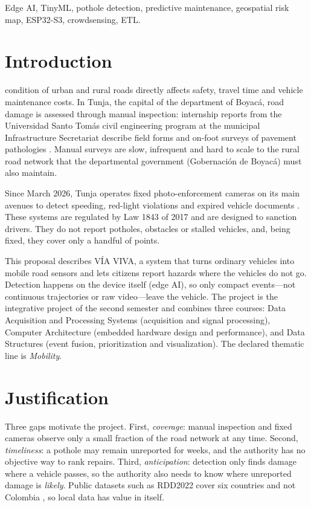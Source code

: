 \documentclass[journal,10pt]{IEEEtran}
\begin{document}
\begin{IEEEkeywords}
Edge AI, TinyML, pothole detection, predictive maintenance, geospatial risk map, ESP32-S3, crowdsensing, ETL.
\end{IEEEkeywords}

\section{Introduction}
 condition of urban and rural roads directly affects safety, travel time and vehicle maintenance costs. In Tunja, the capital of the department of Boyac\'a, road damage is assessed through manual inspection: internship reports from the Universidad Santo Tom\'as civil engineering program at the municipal Infrastructure Secretariat describe field forms and on-foot surveys of pavement pathologies \cite{caballero2022practica}. Manual surveys are slow, infrequent and hard to scale to the rural road network that the departmental government (Gobernaci\'on de Boyac\'a) must also maintain.

Since March 2026, Tunja operates fixed photo-enforcement cameras on its main avenues to detect speeding, red-light violations and expired vehicle documents \cite{infobae2026tunja}. These systems are regulated by Law 1843 of 2017 \cite{ley1843} and are designed to sanction drivers. They do not report potholes, obstacles or stalled vehicles, and, being fixed, they cover only a handful of points.

This proposal describes V\'IA VIVA, a system that turns ordinary vehicles into mobile road sensors and lets citizens report hazards where the vehicles do not go. Detection happens on the device itself (edge AI), so only compact events---not continuous trajectories or raw video---leave the vehicle. The project is the integrative project of the second semester and combines three courses: Data Acquisition and Processing Systems (acquisition and signal processing), Computer Architecture (embedded hardware design and performance), and Data Structures (event fusion, prioritization and visualization). The declared thematic line is \textit{Mobility}.

\section{Justification}
Three gaps motivate the project. First, \emph{coverage}: manual inspection and fixed cameras observe only a small fraction of the road network at any time. Second, \emph{timeliness}: a pothole may remain unreported for weeks, and the authority has no objective way to rank repairs. Third, \emph{anticipation}: detection only finds damage where a vehicle passes, so the authority also needs to know where unreported damage is \emph{likely}. Public datasets such as RDD2022 cover six countries and not Colombia \cite{arya2022rdd}, so local data has value in itself.
\end{document}
